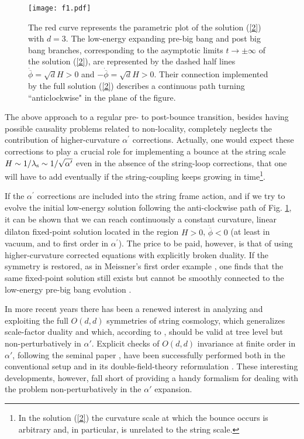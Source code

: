 \documentclass[a4paper,11pt]{article}
\def \ra {\rightarrow}
\def \ls {\lambda_{\rm s}}
\def \ap {\alpha^{\prime}}
\def \fb {\overline \phi}
\def \fbp {\dot{\fb}}
\begin{document}
\begin{figure}[t]
\centering
\texttt{[image: f1.pdf]}
\caption{The red curve represents the parametric plot of the solution (\ref{2}) with $d=3$. The low-energy expanding pre-big bang and post big bang branches, corresponding to the asymptotic limits $t \ra \pm \infty$ of the solution (\ref{2}), are represented by the dashed half lines $\fbp = \sqrt d H>0$ and $-\fbp = \sqrt d H>0$. Their connection implemented by the full solution (\ref{2}) describes a continuous path turning  ``anticlockwise" in the plane of the figure.}
\label{f1}
\end{figure}

The above approach to a regular pre- to post-bounce transition, besides having possible causality problems related to non-locality, completely neglects the contribution of  
higher-curvature $\ap$ corrections. Actually, one would expect these corrections to play a crucial role for implementing a bounce  at the string scale $H \sim 1/\ls \sim 1/\sqrt{\ap}$ even in the absence of the string-loop corrections, that one will have to add eventually if the string-coupling keeps growing in time\footnote{In the solution (\ref{2}) the curvature scale at which the bounce occurs is arbitrary and, in particular, is unrelated to the string scale.}. 

If the $\ap$ corrections are included into the string frame action, and if we try to evolve the initial low-energy solution following the anti-clockwise path of Fig. \ref{f1}, it can be shown \cite{13} that we can reach continuously  a constant curvature, linear dilaton fixed-point solution located in the region $H>0$, $\fbp<0$ (at least in vacuum, and to first order in $\ap$). The price to be paid, however, is that of using higher-curvature corrected equations with explicitly broken  duality. If the symmetry is restored, as in Meissner's   first order example \cite{14}, one finds that the same fixed-point solution still exists but  cannot be smoothly connected to the low-energy pre-big bang evolution \cite{15}. 


In more recent years there has been a renewed interest in analyzing and exploiting the full $O(d,d)$ symmetries of string cosmology, which generalizes scale-factor duality and which, according to \cite{Sen}, should be valid  at tree level but non-perturbatively in $\alpha'$. Explicit checks of $O(d,d)$ invariance at finite order in $\alpha'$, following the seminal paper \cite{14}, have been successfully performed  both in the conventional setup \cite{Codina1,Codina2} and in its double-field-theory reformulation \cite{Hohm1,Hohm2}.
These interesting developments, however, fall short of providing a handy formalism for dealing with the problem non-perturbatively in the $\alpha'$ expansion.
\end{document}
